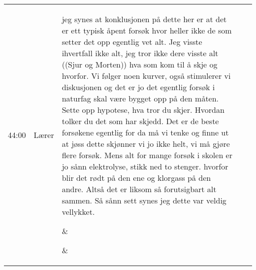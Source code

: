 \begin{center}
\begin{longtable}{r p{1.5cm} p{5cm} p{4cm} p{3cm} }
44:00 %
&Lærer %
&\parbox[t]{5cm}{\raggedright jeg synes at konklusjonen på dette her er at det er ett typisk åpent forsøk hvor heller ikke de som setter det opp egentlig vet alt. Jeg visste ihvertfall ikke alt, jeg tror ikke dere visste alt ((Sjur og Morten)) hva som kom til å skje og hvorfor. Vi følger noen kurver, også stimulerer vi diskusjonen og det er jo det egentlig forsøk i naturfag skal være bygget opp på den måten. Sette opp hypotese, hva tror du skjer. Hvordan tolker du det som har skjedd. Det er de beste forsøkene egentlig for da må vi tenke og finne ut at jøss dette skjønner vi jo ikke helt, vi må gjøre flere forsøk. Mens alt for mange forsøk i skolen er jo sånn elektrolyse, stikk ned to stenger. hvorfor blir det rødt på den ene og klorgass på den andre. Altså det er liksom så forutsigbart alt sammen. Så sånn sett synes jeg dette var veldig vellykket.  %
}&\parbox[t]{4cm}{\raggedright  %
}&\parbox[t]{3cm}{\raggedright%
}\\

\end{longtable}
\end{center}

\newpage
